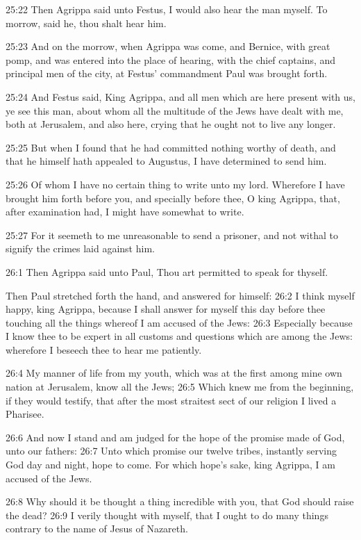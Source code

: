 25:22 Then Agrippa said unto Festus, I would also hear the man myself.
To morrow, said he, thou shalt hear him.

25:23 And on the morrow, when Agrippa was come, and Bernice, with
great pomp, and was entered into the place of hearing, with the chief
captains, and principal men of the city, at Festus' commandment Paul
was brought forth.

25:24 And Festus said, King Agrippa, and all men which are here
present with us, ye see this man, about whom all the multitude of the
Jews have dealt with me, both at Jerusalem, and also here, crying that
he ought not to live any longer.

25:25 But when I found that he had committed nothing worthy of death,
and that he himself hath appealed to Augustus, I have determined to
send him.

25:26 Of whom I have no certain thing to write unto my lord. Wherefore
I have brought him forth before you, and specially before thee, O king
Agrippa, that, after examination had, I might have somewhat to write.

25:27 For it seemeth to me unreasonable to send a prisoner, and not
withal to signify the crimes laid against him.

26:1 Then Agrippa said unto Paul, Thou art permitted to speak for
thyself.

Then Paul stretched forth the hand, and answered for himself: 26:2 I
think myself happy, king Agrippa, because I shall answer for myself
this day before thee touching all the things whereof I am accused of
the Jews: 26:3 Especially because I know thee to be expert in all
customs and questions which are among the Jews: wherefore I beseech
thee to hear me patiently.

26:4 My manner of life from my youth, which was at the first among
mine own nation at Jerusalem, know all the Jews; 26:5 Which knew me
from the beginning, if they would testify, that after the most
straitest sect of our religion I lived a Pharisee.

26:6 And now I stand and am judged for the hope of the promise made of
God, unto our fathers: 26:7 Unto which promise our twelve tribes,
instantly serving God day and night, hope to come. For which hope's
sake, king Agrippa, I am accused of the Jews.

26:8 Why should it be thought a thing incredible with you, that God
should raise the dead?  26:9 I verily thought with myself, that I
ought to do many things contrary to the name of Jesus of Nazareth.

